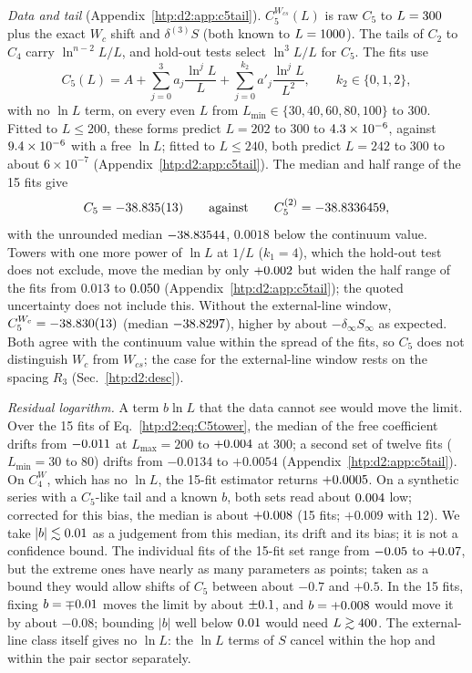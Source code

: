 \emph{Data and tail} (Appendix~\ref{htp:d2:app:c5tail}). $C_5^{W_{cs}}(L)$ is raw $C_5$ to $L=300$ plus the exact $W_c$ shift and $\delta^{(3)}S$ (both
known to $L=1000$). The tails of $C_2$ to $C_4$ carry $\ln^{n-2}L/L$, and hold-out tests select $\ln^3L/L$ for $C_5$. The
fits use
\begin{equation}
 C_5(L)=A+\sum_{j=0}^{3}a_j\frac{\ln^jL}{L}+\sum_{j=0}^{k_2}a'_j\frac{\ln^jL}{L^2},\qquad k_2\in\{0,1,2\},
 \label{htp:d2:eq:C5tower}
\end{equation}
with no $\ln L$ term, on every even $L$ from $L_{\min}\in\{30,40,60,80,100\}$ to 300. Fitted to $L\le200$, these forms
predict $L=202$ to 300 to $4.3\times10^{-6}$, against $9.4\times10^{-6}$ with a free $\ln L$; fitted to $L\le240$, both
predict $L=242$ to 300 to about $6\times10^{-7}$ (Appendix~\ref{htp:d2:app:c5tail}). The median and half range
of the 15 fits give
\begin{equation}
 C_5=-38.835(13)\qquad\text{against}\qquad C_5^{(2)}=-38.8336459 ,
 \label{htp:d2:eq:C5}
\end{equation}
with the unrounded median $-38.83544$, $0.0018$ below the continuum value. Towers with one more power of $\ln L$
at $1/L$ ($k_1=4$), which the hold-out test does not exclude, move the median by only $+0.002$ but widen the half range
of the fits from $0.013$ to $0.050$ (Appendix~\ref{htp:d2:app:c5tail}); the quoted uncertainty does not include
this. Without the external-line window,
$C_5^{W_c}=-38.830(13)$ (median $-38.8297$), higher by about $-\delta_\infty S_\infty$ as expected. Both agree
with the continuum value within the spread of the fits, so $C_5$ does not distinguish $W_c$ from $W_{cs}$; the case for
the external-line window rests on the spacing $R_3$ (Sec.~\ref{htp:d2:desc}).

\emph{Residual logarithm.}\label{htp:d2:c5log} A term $b\ln L$ that the data cannot see would move the limit. Over the 15
fits of Eq.~\eqref{htp:d2:eq:C5tower}, the median of the free coefficient drifts from $-0.011$ at $L_{\max}=200$
to $+0.004$ at 300; a second set of twelve fits ($L_{\min}=30$ to 80) drifts from $-0.0134$ to $+0.0054$
(Appendix~\ref{htp:d2:app:c5tail}). On $C_4^W$, which has no $\ln L$, the 15-fit estimator returns $+0.0005$. On a synthetic
series with a $C_5$-like tail and a known $b$, both sets read about $0.004$ low; corrected for this bias, the median
is about $+0.008$ (15 fits; $+0.009$ with 12). We take $|b|\lesssim0.01$ as a judgement from this median, its
drift and its bias; it is not a confidence bound. The individual fits of the 15-fit set range from $-0.05$ to
$+0.07$, but the extreme ones have nearly as many parameters as points; taken as a bound they would allow shifts of
$C_5$ between about $-0.7$ and $+0.5$. In the 15 fits, fixing $b=\mp0.01$ moves the limit by about
$\pm0.1$, and $b=+0.008$ would move it by about $-0.08$; bounding $|b|$ well below $0.01$ would
need $L\gtrsim400$. The external-line class itself gives no $\ln L$: the
$\ln L$ terms of $S$ cancel within the hop and within the pair sector separately.

